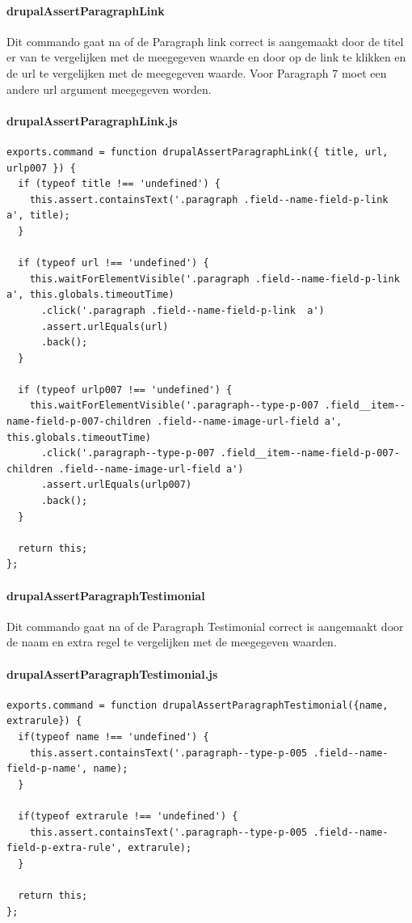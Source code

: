 \clearpage
\paragraph{drupalAssertParagraphLink}
\label{commando7}
Dit commando gaat na of de Paragraph link correct is aangemaakt door de titel er van te vergelijken met de meegegeven waarde en door op de link te klikken en de url te vergelijken met de meegegeven waarde. Voor Paragraph 7 moet een andere url argument meegegeven worden.
\paragraph{drupalAssertParagraphLink.js}
\begin{lstlisting}[breaklines=true]
exports.command = function drupalAssertParagraphLink({ title, url, urlp007 }) {
  if (typeof title !== 'undefined') {
    this.assert.containsText('.paragraph .field--name-field-p-link  a', title);
  }

  if (typeof url !== 'undefined') {
    this.waitForElementVisible('.paragraph .field--name-field-p-link  a', this.globals.timeoutTime)
      .click('.paragraph .field--name-field-p-link  a')
      .assert.urlEquals(url)
      .back();
  }

  if (typeof urlp007 !== 'undefined') {
    this.waitForElementVisible('.paragraph--type-p-007 .field__item--name-field-p-007-children .field--name-image-url-field a', this.globals.timeoutTime)
      .click('.paragraph--type-p-007 .field__item--name-field-p-007-children .field--name-image-url-field a')
      .assert.urlEquals(urlp007)
      .back();
  }

  return this;
};
\end{lstlisting}


\clearpage
\paragraph{drupalAssertParagraphTestimonial}
\label{commando8}
Dit commando gaat na of de Paragraph Testimonial correct is aangemaakt door de naam en extra regel te vergelijken met de meegegeven waarden.
\paragraph{drupalAssertParagraphTestimonial.js}
\begin{lstlisting}[breaklines=true]
exports.command = function drupalAssertParagraphTestimonial({name, extrarule}) {
  if(typeof name !== 'undefined') {
    this.assert.containsText('.paragraph--type-p-005 .field--name-field-p-name', name);
  }

  if(typeof extrarule !== 'undefined') {
    this.assert.containsText('.paragraph--type-p-005 .field--name-field-p-extra-rule', extrarule);
  }
  
  return this;
};
\end{lstlisting}


